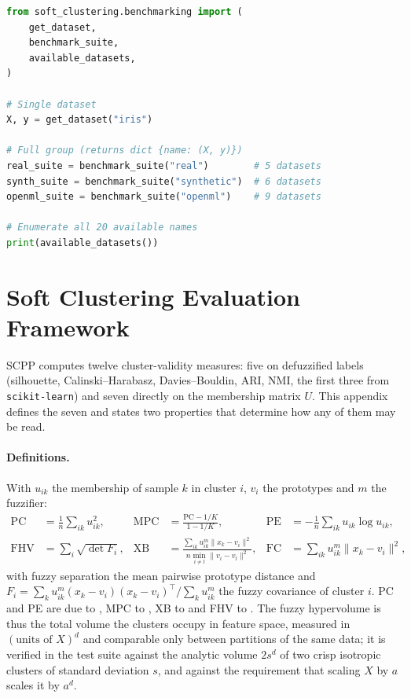 \documentclass[twoside,11pt]{article}
\begin{document}
\begin{lstlisting}[language=Python, caption={Loading a single dataset.}]
from soft_clustering.benchmarking import (
    get_dataset,
    benchmark_suite,
    available_datasets,
)

# Single dataset
X, y = get_dataset("iris")

# Full group (returns dict {name: (X, y)})
real_suite = benchmark_suite("real")        # 5 datasets
synth_suite = benchmark_suite("synthetic")  # 6 datasets
openml_suite = benchmark_suite("openml")    # 9 datasets

# Enumerate all 20 available names
print(available_datasets())
\end{lstlisting}

\section{Soft Clustering Evaluation Framework}\label{app:metrics}

SCPP computes twelve cluster-validity measures: five on defuzzified labels
(silhouette, Calinski--Harabasz, Davies--Bouldin, ARI, NMI, the first three
from \texttt{scikit-learn}) and seven directly on the membership matrix $U$.
This appendix defines the seven and states two properties that determine how
any of them may be read.

\paragraph{Definitions.} With $u_{ik}$ the membership of sample $k$ in
cluster $i$, $v_i$ the prototypes and $m$ the fuzzifier:
\begin{align*}
\mathrm{PC} &= \tfrac1n \textstyle\sum_{ik} u_{ik}^2,
&\mathrm{MPC} &= \frac{\mathrm{PC} - 1/K}{1 - 1/K},
&\mathrm{PE} &= -\tfrac1n \textstyle\sum_{ik} u_{ik}\log u_{ik},\\[2pt]
\mathrm{FHV} &= \textstyle\sum_i \sqrt{\det F_i},
&\mathrm{XB} &= \frac{\sum_{ik} u_{ik}^m \lVert x_k - v_i\rVert^2}
                     {n \min_{i \neq l}\lVert v_i - v_l\rVert^2},
&\mathrm{FC} &= \textstyle\sum_{ik} u_{ik}^m \lVert x_k - v_i \rVert^2,
\end{align*}
with fuzzy separation the mean pairwise prototype distance and
$F_i = \sum_k u_{ik}^m (x_k - v_i)(x_k - v_i)^\top / \sum_k u_{ik}^m$ the
fuzzy covariance of cluster $i$. PC and PE are due to \citet{bezdek1981pattern},
MPC to \citet{dave1996validating}, XB to \citet{xie1991validity} and FHV to
\citet{gath1989fuzzy}. The fuzzy hypervolume
is thus the total volume the clusters occupy in feature space, measured in
$(\text{units of }X)^d$ and comparable only between partitions of the same
data; it is verified in the test suite against the analytic volume
$2s^d$ of two crisp isotropic clusters of standard deviation $s$, and against
the requirement that scaling $X$ by $a$ scales it by $a^d$.
\end{document}
